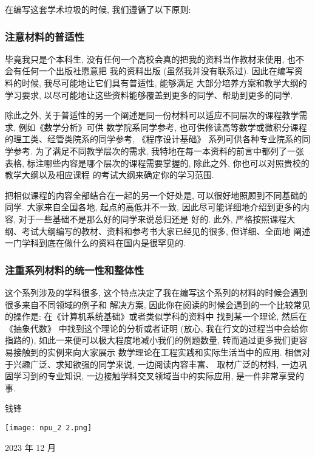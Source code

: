 在编写这套学术垃圾的时候, 我们遵循了以下原则:
\setcounter{subsubsection}{0}
\subsubsection{注意材料的普适性}

毕竟我只是个本科生, 没有任何一个高校会真的把我的资料当作教材来使用, 也不会有任何一个出版社愿意把
我的资料出版 (虽然我并没有联系过). 因此在编写资料的时候, 我尽可能地让它们具有普适性, 能够满足
大部分培养方案和教学大纲的学习要求, 以尽可能地让这些资料能够覆盖到更多的同学、帮助到更多的同学.

除此之外, 关于普适性的另一个阐述是同一份材料可以适应不同层次的课程教学需求, 例如《数学分析》可供
数学院系同学参考, 也可供修读高等数学或微积分课程的理工类、经管类院系的同学参考, 《程序设计基础》
系列可供各种专业院系的同学参考. 为了满足不同教学层次的需求, 我特地在每一本资料的前言中都列了一张
表格, 标注哪些内容是哪个层次的课程需要掌握的, 除此之外, 你也可以对照贵校的教学大纲以及相应课程
的考试大纲来确定你的学习范围.

把相似课程的内容全部结合在一起的另一个好处是, 可以很好地照顾到不同基础的同学. 大家来自全国各地,
起点的高低并不一致, 因此尽可能详细地介绍到更多的内容, 对于一些基础不是那么好的同学来说总归还是
好的. 此外, 严格按照课程大纲、考试大纲编写的教材、资料和参考书大家已经见的很多, 但详细、全面地
阐述一门学科到底在做什么的资料在国内是很罕见的.

\subsubsection{注重系列材料的统一性和整体性}

这个系列涉及的学科很多, 这个特点决定了我在编写这个系列的材料的时候会遇到很多来自不同领域的例子和
解决方案, 因此你在阅读的时候会遇到的一个比较常见的操作是: 在《计算机系统基础》或者类似学科的资料中
找到某一个理论, 然后在 《抽象代数》 中找到这个理论的分析或者证明 (放心, 我在行文的过程当中会给你
指路的), 如此一来便可以极大程度地减小我们的例题数量, 转而通过更多我们更容易接触到的实例来向大家展示
数学理论在工程实践和实际生活当中的应用. 相信对于兴趣广泛、求知欲强的同学来说, 一边阅读内容丰富、
取材广泛的材料, 一边巩固学习到的专业知识, 一边接触学科交叉领域当中的实际应用, 是一件非常享受的事.

\begin{flushright}
    \kaishu
    钱锋

    \texttt{[image: npu\_2 2.png]}
    \raisebox{0.5\height}{软件学院}

    2023 年 12 月
    \songti
\end{flushright}

\newpage
\thispagestyle{empty}